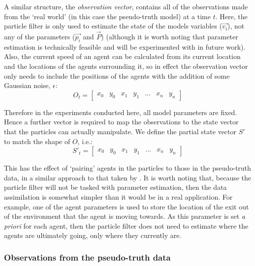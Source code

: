 A similar structure, the \textit{observation vector}, contains all of the observations made from the `real world' (in this case the pseudo-truth model) at a time $t$. Here, the particle filter is only used to estimate the state of the models variables ($\overrightarrow{v_i}$), not any of the parameters ($\overrightarrow{p_i}$ and $\overrightarrow{P}$) (although it is worth noting that parameter estimation is technically feasible and will be experimented with in future work). Also, the current speed of an agent can be calculated from its current location and the locations of the agents surrounding it, so in effect the observation vector only needs to include the positions of the agents with the addition of some Gaussian noise, $\epsilon$:
\begin{equation}
  O_t  = \left[ \begin{array}{ccccccc}
x_0 & y_0 & x_1 & y_1 & \dots & x_n & y_n 
\end{array} \right]
\end{equation} 

 Therefore in the experiments conducted here, all model parameters are fixed. Hence a further vector is required to map the observations to the state vector that the particles can actually manipulate. We define the partial state vector $S'$ to match the shape of $O$, i.e.:
\begin{equation}
  S'_t  = \left[ \begin{array}{ccccccc}
x_0 & y_0 & x_1 & y_1 & \dots & x_n & y_n 
\end{array} \right]
\end{equation} 

This has the effect of `pairing' agents in the particles to those in the pseudo-truth data, in a similar approach to that taken by \citep{wang_data_2015}. It is worth noting that, because the particle filter will not be tasked with parameter estimation, then the data assimilation is somewhat simpler than it would be in a real application. For example, one of the agent parameters is used to store the location of the exit out of the environment that the agent is moving towards. As this parameter is set \textit{a priori} for each agent, then the particle filter does not need to estimate where the agents are ultimately going, only where they currently are.

\subsubsection{Observations from the pseudo-truth data}

